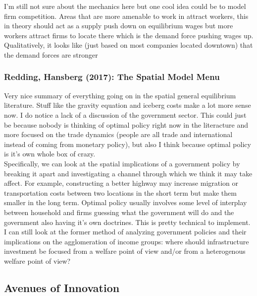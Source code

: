 \documentclass[11pt,english]{article}
\begin{document}
\noindent I'm still not sure about the mechanics here but one cool idea could be to model firm competition. Areas that are more amenable to work in attract workers, this in theory should act as a supply push down on equilibrium wages but more workers attract firms to locate there which is the demand force pushing wages up. Qualitatively, it looks like (just based on most companies located downtown) that the demand forces are stronger 


\subsubsection{Redding, Hansberg (2017): The Spatial Model Menu\cite{ReddingHansberg2017}}

Very nice summary of everything going on in the spatial general equilibrium literature. Stuff like the gravity equation and iceberg costs make a lot more sense now. I do notice a lack of a discussion of the government sector. This could just be because nobody is thinking of optimal policy right now in the literacture and more focused on the trade dynamics (people are all trade and international instead of coming from monetary policy), but also I think because optimal policy is it's own whole box of crazy. \\

\noindent Specifically, we can look at the spatial implications of a government policy by breaking it apart and investigating a channel through which we think it may take affect. For example, constructing a better highway may increase migration or transportation costs between two locations in the short term but make them smaller in the long term. Optimal policy usually involves some level of interplay between household and firms guessing what the government will do and the government also having it's own doctrines. This is pretty technical to implement. I can still look at the former method of analyzing government policies and their implications on the agglomeration of income groups: where should infrastructure investment be focused from a welfare point of view and/or from a heterogenous welfare point of view?


\subsection{Avenues of Innovation}
\end{document}
